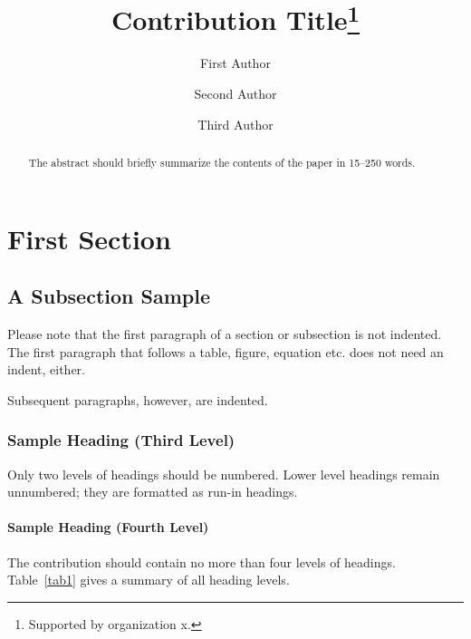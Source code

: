 \documentclass[runningheads]{llncs}
\begin{document}
%
\title{Contribution Title\thanks{Supported by organization x.}}
%
%
\author{First Author \and
Second Author \and
Third Author}
%
%
%
\maketitle              %
%
\begin{abstract}
The abstract should briefly summarize the contents of the paper in
15--250 words.

\end{abstract}
%
%
%
\section{First Section}
\subsection{A Subsection Sample}
Please note that the first paragraph of a section or subsection is
not indented. The first paragraph that follows a table, figure,
equation etc. does not need an indent, either.

Subsequent paragraphs, however, are indented.

\subsubsection{Sample Heading (Third Level)} Only two levels of
headings should be numbered. Lower level headings remain unnumbered;
they are formatted as run-in headings.

\paragraph{Sample Heading (Fourth Level)}
The contribution should contain no more than four levels of
headings. Table~\ref{tab1} gives a summary of all heading levels.
\end{document}
